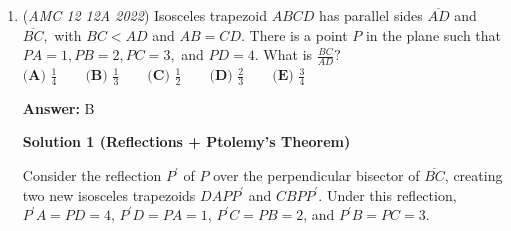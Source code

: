 \begin{enumerate}
 
Since arrangements of $A$ and $B$ between different values of $x$ are disjoint, we can sum without worrying about overcounting:
 \[\binom{13}{1} + \binom{13}{2} + \cdots + \binom{13}{12} - 12.\]

 The sum looks awfully similar to the Pascal's Triangle row-sum identity:
 \[\sum_{k=0}^{13}\binom{13}{k} = \binom{13}{0} + \binom{13}{1} + \ldots + \binom{13}{13} = 2^{13}\]

 With a little bit of wishful thinking and rearranging, we get
 \begin{align*} \binom{13}{0} + \binom{13}{1} + \cdots + \binom{13}{13} - \binom{13}{0} - \binom{13}{13} - 12 &= 2^{13} - \binom{13}{0} - \binom{13}{13} - 12 \\ \binom{13}{1} + \binom{13}{2} + \cdots + \binom{13}{12} - 12 &= 2^{13} - \binom{13}{0} - \binom{13}{13} - 12 \\ &= 8192 - 1 - 1 - 12 \\ &= \boxed{\textbf{(D) } 8178}. \end{align*}





\textbf{Solution 8 (SOOOO Easy Combinatorics)}

We notice that we have to choose $n$ cards to pick up in one pass, and $13-n$ cards in the other pass. We choose $n$ cards from 13, so we need to evaluate $\sum_{n=1}^{12}{\binom{13}{n}}$, which is just one row of Pascal's Triangle minus the $1$ on both sides, since we cannot pick up 0 or all 13 cards on the first go. Next, we need to remove the 12 cases ($1$ for each $n$) that just happen to make the deck in ascending order, making the total $8190-12=8178$, which is $\boxed{\textbf{(D) } 8178}$.

 


	\item (\textit{AMC 12 12A 2022}) Isosceles trapezoid $ABCD$ has parallel sides $\overline{AD}$ and $\overline{BC},$ with $BC < AD$ and $AB = CD.$ There is a point $P$ in the plane such that $PA=1, PB=2, PC=3,$ and $PD=4.$ What is $\frac{BC}{AD}?$
$\textbf{(A) }\frac{1}{4}\qquad\textbf{(B) }\frac{1}{3}\qquad\textbf{(C) }\frac{1}{2}\qquad\textbf{(D) }\frac{2}{3}\qquad\textbf{(E) }\frac{3}{4}$

 \textbf{Answer: }B



\textbf{Solution 1 (Reflections + Ptolemy's Theorem)}

Consider the reflection $P^{\prime}$ of $P$ over the perpendicular bisector of $\overline{BC}$, creating two new isosceles trapezoids $DAPP^{\prime}$ and $CBPP^{\prime}$. Under this reflection, $P^{\prime}A=PD=4$, $P^{\prime}D=PA=1$, $P^{\prime}C=PB=2$, and $P^{\prime}B=PC=3$. 


\end{enumerate}
